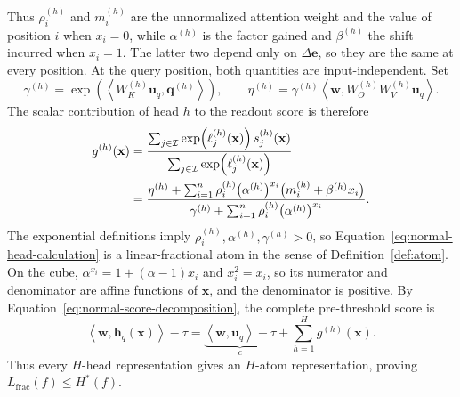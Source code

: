 \documentclass{article}
\theoremstyle{definition}
\theoremstyle{plain}
\newcommand{\hstar}{H^{\ast}}
\begin{document}
Thus $\rho_i^{(h)}$ and $m_i^{(h)}$ are the unnormalized attention weight and the value of position $i$ when $x_i=0$, while $\alpha^{(h)}$ is the factor gained and $\beta^{(h)}$ the shift incurred when $x_i=1$. The latter two depend only on $\Delta\mathbf{e}$, so they are the same at every position. At the query position, both quantities are input-independent. Set
\begin{equation}
\gamma^{(h)}
=\exp\!\left(\left\langle W_K^{(h)}\mathbf{u}_q,\mathbf{q}^{(h)}\right\rangle\right),
\qquad
\eta^{(h)}
=\gamma^{(h)}
\left\langle\mathbf{w},W_O^{(h)}W_V^{(h)}\mathbf{u}_q\right\rangle.
\label{eq:normal-query-parameters}
\end{equation}
The scalar contribution of head $h$ to the readout score is therefore
\begin{align}
g^{(h)}(\mathbf{x})
&=\frac{\sum_{j\in\mathcal{I}}
\exp\!\left(\ell_j^{(h)}(\mathbf{x})\right)s_j^{(h)}(\mathbf{x})}
{\sum_{j\in\mathcal{I}}\exp\!\left(\ell_j^{(h)}(\mathbf{x})\right)}
\notag\\
&=\frac{\eta^{(h)}+\sum_{i=1}^{n}\rho_i^{(h)}
\bigl(\alpha^{(h)}\bigr)^{x_i}
\bigl(m_i^{(h)}+\beta^{(h)}x_i\bigr)}
{\gamma^{(h)}+\sum_{i=1}^{n}\rho_i^{(h)}
\bigl(\alpha^{(h)}\bigr)^{x_i}}.
\label{eq:normal-head-calculation}
\end{align}
The exponential definitions imply $\rho_i^{(h)},\alpha^{(h)},\gamma^{(h)}>0$, so Equation~\eqref{eq:normal-head-calculation} is a linear-fractional atom in the sense of Definition~\ref{def:atom}. On the cube, $\alpha^{x_i}=1+(\alpha-1)x_i$ and $x_i^2=x_i$, so its numerator and denominator are affine functions of $\mathbf{x}$, and the denominator is positive. By Equation~\eqref{eq:normal-score-decomposition}, the complete pre-threshold score is
\begin{equation}
\left\langle\mathbf{w},\mathbf{h}_q(\mathbf{x})\right\rangle-\tau
=\underbrace{\left\langle\mathbf{w},\mathbf{u}_q\right\rangle-\tau}_{c}
+\sum_{h=1}^{H}g^{(h)}(\mathbf{x}).
\end{equation}
Thus every $H$-head representation gives an $H$-atom representation, proving $L_{\mathrm{frac}}(f)\leq\hstar(f)$.
\end{document}

